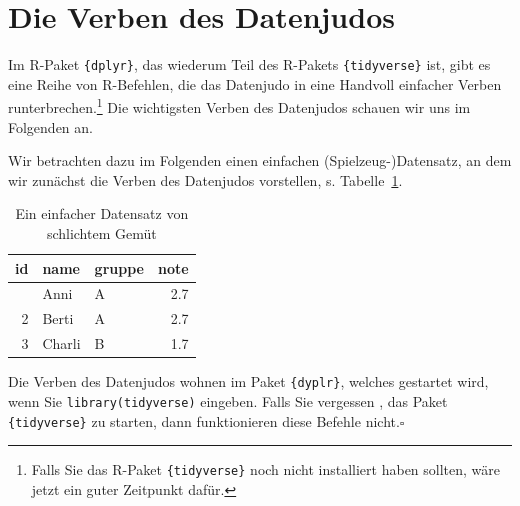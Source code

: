\documentclass[
  a4paper,
  DIV=11]{scrreprt}
\theoremstyle{definition}
\theoremstyle{definition}
\theoremstyle{definition}
\theoremstyle{remark}
\begin{document}
\section{Die Verben des Datenjudos}\label{die-verben-des-datenjudos}

Im R-Paket \texttt{\{dplyr\}}, das wiederum Teil des R-Pakets
\texttt{\{tidyverse\}} ist, gibt es eine Reihe von R-Befehlen, die das
Datenjudo in eine Handvoll einfacher Verben runterbrechen.\footnote{Falls
  Sie das R-Paket \texttt{\{tidyverse\}} noch nicht installiert haben
  sollten, wäre jetzt ein guter Zeitpunkt dafür.} Die wichtigsten Verben
des Datenjudos schauen wir uns im Folgenden an.

Wir betrachten dazu im Folgenden einen einfachen (Spielzeug-)Datensatz,
an dem wir zunächst die Verben des Datenjudos vorstellen, s.
Tabelle~\ref{tbl-datenjudo}.

\begin{longtable}{rllr}

\caption{\label{tbl-datenjudo}Ein einfacher Datensatz von schlichtem
Gemüt}

\tabularnewline

\toprule
id & name & gruppe & note \\ 
\midrule\addlinespace[2.5pt]
1 & Anni & A & 2.7 \\ 
2 & Berti & A & 2.7 \\ 
3 & Charli & B & 1.7 \\ 
\bottomrule

\end{longtable}

\begin{tcolorbox}[enhanced jigsaw, leftrule=.75mm, opacitybacktitle=0.6, colback=white, colframe=quarto-callout-important-color-frame, coltitle=black, colbacktitle=quarto-callout-important-color!10!white, opacityback=0, left=2mm, breakable, titlerule=0mm, toptitle=1mm, bottomtitle=1mm, rightrule=.15mm, title=\textcolor{quarto-callout-important-color}{\faExclamation}\hspace{0.5em}{Wichtig}, arc=.35mm, bottomrule=.15mm, toprule=.15mm]

Die Verben des Datenjudos wohnen im Paket \texttt{\{dyplr\}}, welches
gestartet wird, wenn Sie \texttt{library(tidyverse)} eingeben. Falls Sie
vergessen , das Paket \texttt{\{tidyverse\}} zu starten, dann
funktionieren diese Befehle nicht.\(\square\)

\end{tcolorbox}
\end{document}
